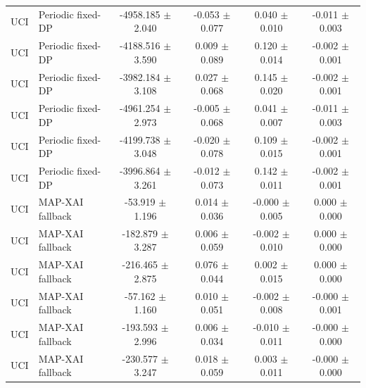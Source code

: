 \begin{table}[t]
\begin{tabular}{llcccc}
UCI & Periodic fixed-DP & -4958.185 $\pm$ 2.040 & -0.053 $\pm$ 0.077 & 0.040 $\pm$ 0.010 & -0.011 $\pm$ 0.003 \\
UCI & Periodic fixed-DP & -4188.516 $\pm$ 3.590 & 0.009 $\pm$ 0.089 & 0.120 $\pm$ 0.014 & -0.002 $\pm$ 0.001 \\
UCI & Periodic fixed-DP & -3982.184 $\pm$ 3.108 & 0.027 $\pm$ 0.068 & 0.145 $\pm$ 0.020 & -0.002 $\pm$ 0.001 \\
UCI & Periodic fixed-DP & -4961.254 $\pm$ 2.973 & -0.005 $\pm$ 0.068 & 0.041 $\pm$ 0.007 & -0.011 $\pm$ 0.003 \\
UCI & Periodic fixed-DP & -4199.738 $\pm$ 3.048 & -0.020 $\pm$ 0.078 & 0.109 $\pm$ 0.015 & -0.002 $\pm$ 0.001 \\
UCI & Periodic fixed-DP & -3996.864 $\pm$ 3.261 & -0.012 $\pm$ 0.073 & 0.142 $\pm$ 0.011 & -0.002 $\pm$ 0.001 \\
UCI & MAP-XAI fallback & -53.919 $\pm$ 1.196 & 0.014 $\pm$ 0.036 & -0.000 $\pm$ 0.005 & 0.000 $\pm$ 0.000 \\
UCI & MAP-XAI fallback & -182.879 $\pm$ 3.287 & 0.006 $\pm$ 0.059 & -0.002 $\pm$ 0.010 & 0.000 $\pm$ 0.000 \\
UCI & MAP-XAI fallback & -216.465 $\pm$ 2.875 & 0.076 $\pm$ 0.044 & 0.002 $\pm$ 0.015 & 0.000 $\pm$ 0.000 \\
UCI & MAP-XAI fallback & -57.162 $\pm$ 1.160 & 0.010 $\pm$ 0.051 & -0.002 $\pm$ 0.008 & -0.000 $\pm$ 0.001 \\
UCI & MAP-XAI fallback & -193.593 $\pm$ 2.996 & 0.006 $\pm$ 0.034 & -0.010 $\pm$ 0.011 & -0.000 $\pm$ 0.000 \\
UCI & MAP-XAI fallback & -230.577 $\pm$ 3.247 & 0.018 $\pm$ 0.059 & 0.003 $\pm$ 0.011 & -0.000 $\pm$ 0.000 \\
\bottomrule
\end{tabular}
\end{table}
